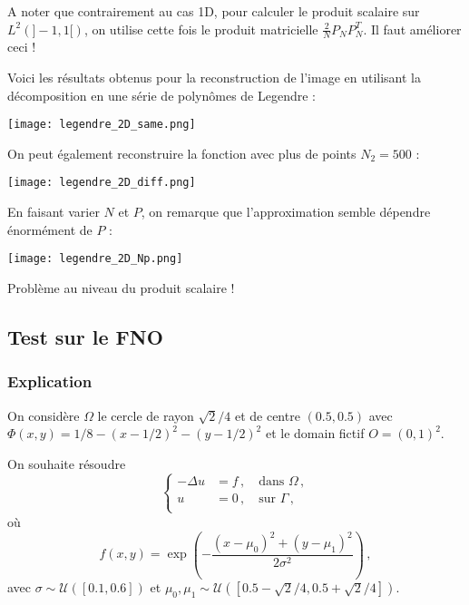\begin{Rem}
	A noter que contrairement au cas 1D, pour calculer le produit scalaire sur $L^2(]-1,1[)$, on utilise cette fois le produit matricielle $\frac{2}{N}P_NP_N^T$. Il faut améliorer ceci !
\end{Rem}

Voici les résultats obtenus pour la reconstruction de l'image en utilisant la décomposition en une série de polynômes de Legendre :

\begin{minipage}{\linewidth}
	\centering
	\texttt{[image: legendre\_2D\_same.png]}
\end{minipage}

\newpage

On peut également reconstruire la fonction avec plus de points $N_2=500$ :

\begin{minipage}{\linewidth}
	\centering
	\texttt{[image: legendre\_2D\_diff.png]}
\end{minipage}

En faisant varier $N$ et $P$, on remarque que l'approximation semble dépendre énormément de $P$ :

\begin{minipage}{\linewidth}
	\centering
	\texttt{[image: legendre\_2D\_Np.png]}
\end{minipage}

\begin{Rem}
	Problème au niveau du produit scalaire !
\end{Rem}

\subsection{Test sur le FNO}

\subsubsection{Explication}

On considère $\Omega$ le cercle de rayon $\sqrt{2}/4$ et de centre $(0.5,0.5)$ avec $\Phi(x,y)=1/8-(x-1/2)^2-(y-1/2)^2$ et le domain fictif $O=(0,1)^2$.

On souhaite résoudre 
\begin{equation*}
	\begin{cases}
		-\Delta u &= f\,, \quad \text{dans $\Omega$}\,, \\
		u &= 0\,, \quad \text{sur $\Gamma$}\,, \\
	\end{cases}
\end{equation*}
où 
$$f(x,y) = \exp\left(-\frac{(x-\mu_0)^2 + (y-\mu_1)^2}{2\sigma^2}\right)\,, $$ 
avec $\sigma \sim \mathcal{U}([0.1,0.6])$ et $\mu_0, \mu_1 \sim \mathcal{U}([0.5-\sqrt{2}/4, 0.5+\sqrt{2}/4])$.

